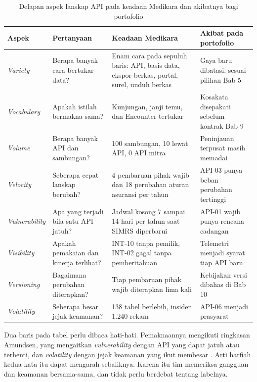 \begin{table}[!htb]
  \centering
  \caption{Delapan aspek lanskap API pada keadaan Medikara dan akibatnya bagi portofolio}
  \label{tab:ch08-lanskap}
  \scriptsize
  \begin{tabularx}{\textwidth}{F{1.6cm}F{3.1cm}EF{3.5cm}}
    \hline
    \textbf{Aspek} & \textbf{Pertanyaan} & \textbf{Keadaan Medikara} & \textbf{Akibat pada portofolio} \\ \hline
    \textit{Variety} & Berapa banyak cara bertukar data? & Enam cara pada sepuluh baris: API, basis data, ekspor berkas, portal, surel, unduh berkas & Gaya baru dibatasi, sesuai pilihan Bab 5 \\ \hline
    \textit{Vocabulary} & Apakah istilah bermakna sama? & Kunjungan, janji temu, dan Encounter tertukar & Kosakata disepakati sebelum kontrak Bab 9 \\ \hline
    \textit{Volume} & Berapa banyak API dan sambungan? & 100 sambungan, 10 lewat API, 0 API mitra & Peninjauan terpusat masih memadai \\ \hline
    \textit{Velocity} & Seberapa cepat lanskap berubah? & 4 pembaruan pihak wajib dan 18 perubahan aturan asuransi per tahun & API-03 punya beban perubahan tertinggi \\ \hline
    \textit{Vulnerability} & Apa yang terjadi bila satu API jatuh? & Jadwal kosong 7 sampai 14 hari per tahun saat SIMRS diperbarui & API-01 wajib punya rencana cadangan \\ \hline
    \textit{Visibility} & Apakah pemakaian dan kinerja terlihat? & INT-10 tanpa pemilik, INT-02 gagal tanpa pemberitahuan & Telemetri menjadi syarat tiap API baru \\ \hline
    \textit{Versioning} & Bagaimana perubahan diterapkan? & Tiap pembaruan pihak wajib diterapkan lima kali & Kebijakan versi dibahas di Bab 10 \\ \hline
    \textit{Volatility} & Seberapa besar jejak keamanan? & 138 tabel berlebih, insiden 1.240 rekam & API-06 menjadi prasyarat \\ \hline
  \end{tabularx}
\end{table}

Dua baris pada tabel perlu dibaca hati-hati. Pemaknaannya mengikuti ringkasan Amundsen, yang mengaitkan \textit{vulnerability}
dengan API yang dapat jatuh atau terhenti, dan \textit{volatility} dengan jejak keamanan yang ikut membesar
\cite{c08-amundsen2020}. Arti harfiah kedua kata itu dapat mengarah sebaliknya. Karena itu tim memeriksa gangguan dan keamanan
bersama-sama, dan tidak perlu berdebat tentang labelnya.

